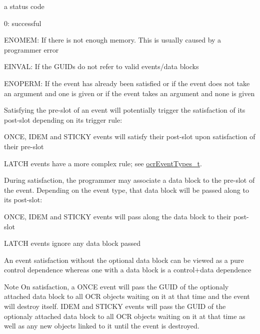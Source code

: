 \returns
a status code
\begin{DoxyItemize}
\item 0\-: successful
\item E\-N\-O\-M\-E\-M\-: If there is not enough memory. This is usually caused by a programmer error
\item E\-I\-N\-V\-A\-L\-: If the G\-U\-I\-Ds do not refer to valid events/data blocks
\item E\-N\-O\-P\-E\-R\-M\-: If the event has already been satisfied or if the event does not take an argument and one is given or if the event takes an argument and none is given
\end{DoxyItemize}
 

\descr
Satisfying the pre-\/slot of an event will potentially trigger the satisfaction of its post-\/slot depending on its trigger rule\-:
\begin{DoxyItemize}
\item O\-N\-C\-E, I\-D\-E\-M and S\-T\-I\-C\-K\-Y events will satisfy their post-\/slot upon satisfaction of their pre-\/slot
\item L\-A\-T\-C\-H events have a more complex rule; 
see \hyperlink{group__OCRTypesEvents_ga42f4195355182edfaa79c9ef3f2c07b1}{ocr\-Event\-Types\-\_\-t}.
\end{DoxyItemize}

During satisfaction, the programmer may associate a data block to the pre-\/slot of the event. Depending 
on the event type, that data block will be passed along to its post-\/slot\-:
\begin{DoxyItemize}
\item O\-N\-C\-E, I\-D\-E\-M and S\-T\-I\-C\-K\-Y events will pass along the data block to their post-\/slot
\item L\-A\-T\-C\-H events ignore any data block passed
\end{DoxyItemize}
An event satisfaction without the optional data block can be viewed as a pure control dependence 
whereas one with a data block is a control+data dependence

\begin{DoxyNote}{Note}
On satisfaction, a O\-N\-C\-E event will pass the G\-U\-I\-D of the optionaly attached data 
block to all O\-C\-R objects waiting on it at that time and the event will destroy itself. I\-D\-E\-M and S\-T\-I\-C\-K\-Y 
events will pass the G\-U\-I\-D of the optionaly attached data block to all O\-C\-R objects waiting on it at that time as 
well as any new objects linked to it until the event is destroyed. 
\end{DoxyNote}

